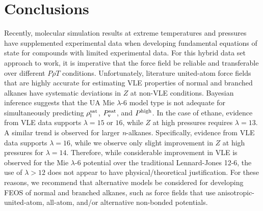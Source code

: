 \documentclass[preprint,letterpaper,floatfix,citeautoscript,aip,jcp]{revtex4-1}
\begin{document}
 
\section{Conclusions} \label{Conclusions}

Recently, molecular simulation results at extreme temperatures and pressures have supplemented experimental data when developing fundamental equations of state for compounds with limited experimental data. For this hybrid data set approach to work, it is imperative that the force field be reliable and transferable over different $P \rho T$ conditions. Unfortunately, literature united-atom force fields that are highly accurate for estimating VLE properties of normal and branched alkanes have systematic deviations in $Z$ at non-VLE conditions. Bayesian inference suggests that the UA Mie $\lambda$-6 model type is not adequate for simultaneously predicting $\rho_{\rm l}^{\rm sat}$, $P_{\rm v}^{\rm sat}$, and $P^{\rm high}$. In the case of ethane, evidence from VLE data supports $\lambda = 15$ or $16$, while $Z$ at high pressures requires $\lambda = 13$. A similar trend is observed for larger \textit{n}-alkanes. Specifically, evidence from VLE data supports $\lambda = 16$, while we observe only slight improvement in $Z$ at high pressures for $\lambda = 14$. Therefore, while considerable improvement in VLE is observed for the Mie $\lambda$-6 potential over the traditional Lennard-Jones 12-6, the use of $\lambda > 12$ does not appear to have physical/theoretical justification. 
%
For these reasons, we recommend that alternative models be considered for developing FEOS of normal and branched alkanes, such as force fields that use anisotropic-united-atom, all-atom, and/or alternative non-bonded potentials.
\end{document}
